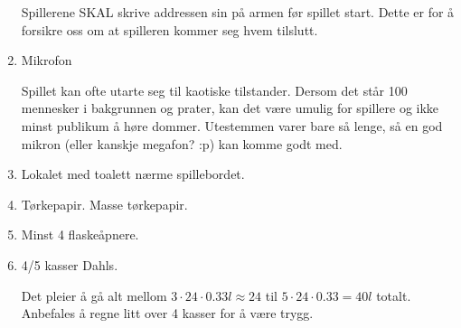 \documentclass[10pt,a4paper,norsk,openany]{book}
\begin{document}
\begin{enumerate}
    Spillerene SKAL skrive addressen sin på armen før spillet start. Dette er for å
    forsikre oss om at spilleren kommer seg hvem tilslutt.

  \item Mikrofon

    Spillet kan ofte utarte seg til kaotiske tilstander. Dersom det står 100
    mennesker i bakgrunnen og prater, kan det være umulig for spillere og ikke minst
    publikum å høre dommer. Utestemmen varer bare så lenge, så en god mikron (eller
    kanskje megafon? :p) kan komme godt med.

  \item Lokalet med toalett nærme spillebordet.

  \item Tørkepapir. Masse tørkepapir.

  \item Minst 4 flaskeåpnere.

  \item 4/5 kasser Dahls.

    Det pleier å gå alt mellom $3 \cdot 24 \cdot 0.33l \approx 24 $ til $5 \cdot 24
    \cdot 0.33 = 40l$ totalt. Anbefales å regne litt over 4 kasser for å være trygg.

\end{enumerate}
\end{document}
